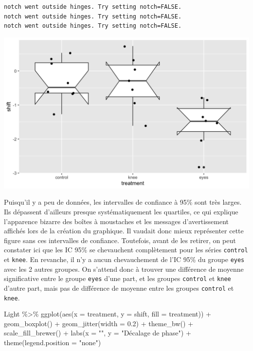 \documentclass[
  a4paper,
]{article}
\newenvironment{Shaded}{\begin{snugshade}}{\end{snugshade}}
\newcommand{\AttributeTok}[1]{\textcolor[rgb]{0.00,0.34,0.68}{#1}}
\newcommand{\FloatTok}[1]{\textcolor[rgb]{0.69,0.50,0.00}{#1}}
\newcommand{\FunctionTok}[1]{\textcolor[rgb]{0.39,0.29,0.61}{#1}}
\newcommand{\NormalTok}[1]{\textcolor[rgb]{0.12,0.11,0.11}{#1}}
\newcommand{\SpecialCharTok}[1]{\textcolor[rgb]{0.24,0.68,0.91}{#1}}
\newcommand{\StringTok}[1]{\textcolor[rgb]{0.75,0.01,0.01}{#1}}
\begin{document}
\begin{verbatim}
notch went outside hinges. Try setting notch=FALSE.
notch went outside hinges. Try setting notch=FALSE.
notch went outside hinges. Try setting notch=FALSE.
\end{verbatim}

\begin{center}\includegraphics[width=0.9\linewidth]{figure/unnamed-chunk-76-1} \end{center}

Puisqu'il y a peu de données, les intervalles de confiance à 95\% sont très larges. Ils dépassent d'ailleurs presque systématiquement les quartiles, ce qui explique l'apparence bizarre des boîtes à moustaches et les messages d'avertissement affichés lors de la création du graphique. Il vaudait donc mieux représenter cette figure sans ces intervalles de confiance. Toutefois, avant de les retirer, on peut constater ici que les IC 95\% se chevauchent complètement pour les séries \texttt{control} et \texttt{knee}. En revanche, il n'y a aucun chevauchement de l'IC 95\% du groupe \texttt{eyes} avec les 2 autres groupes. On s'attend donc à trouver une différence de moyenne significative entre le groupe \texttt{eyes} d'une part, et les groupes \texttt{control} et \texttt{knee} d'autre part, mais pas de différence de moyenne entre les groupes \texttt{control} et \texttt{knee}.

\begin{Shaded}
\begin{Highlighting}[]
\NormalTok{Light }\SpecialCharTok{\%\textgreater{}\%} 
  \FunctionTok{ggplot}\NormalTok{(}\FunctionTok{aes}\NormalTok{(}\AttributeTok{x =}\NormalTok{ treatment, }\AttributeTok{y =}\NormalTok{ shift, }\AttributeTok{fill =}\NormalTok{ treatment)) }\SpecialCharTok{+}
  \FunctionTok{geom\_boxplot}\NormalTok{() }\SpecialCharTok{+}
  \FunctionTok{geom\_jitter}\NormalTok{(}\AttributeTok{width =} \FloatTok{0.2}\NormalTok{) }\SpecialCharTok{+}
  \FunctionTok{theme\_bw}\NormalTok{() }\SpecialCharTok{+}
  \FunctionTok{scale\_fill\_brewer}\NormalTok{() }\SpecialCharTok{+}
  \FunctionTok{labs}\NormalTok{(}\AttributeTok{x =} \StringTok{""}\NormalTok{,}
       \AttributeTok{y =} \StringTok{"Décalage de phase"}\NormalTok{) }\SpecialCharTok{+}
  \FunctionTok{theme}\NormalTok{(}\AttributeTok{legend.position =} \StringTok{"none"}\NormalTok{)}
\end{Highlighting}
\end{Shaded}
\end{document}
